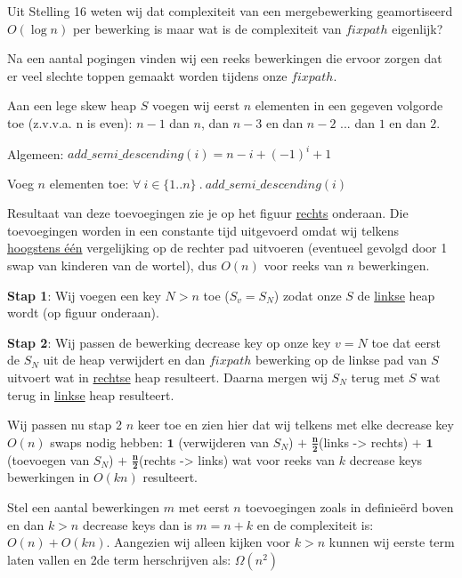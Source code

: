 \documentclass[12pt,a4paper,fleqn]{report}
\begin{document}
	Uit Stelling 16 weten wij dat complexiteit van een mergebewerking geamortiseerd
	$O(\log n)$ per bewerking is maar wat is de complexiteit van $fixpath$
	eigenlijk?
	\newline

	Na een aantal pogingen vinden wij een reeks bewerkingen die ervoor zorgen dat er veel slechte toppen gemaakt worden tijdens onze $fixpath$.

	Aan een lege skew heap $S$ voegen wij eerst $n$ elementen in een
	gegeven volgorde toe (z.v.v.a. n is even):
	$n-1$ dan $n$, dan $n-3$ en dan $n-2$ ... dan $1$ en dan $2$.
	\newline

	Algemeen: $add\_semi\_descending(i) = n - i + (-1)^i + 1$

	Voeg $n$ elementen toe: $\forall\ i\in \{1..n\}\ .\ add\_semi\_descending(i)$
	\newline

	Resultaat van deze toevoegingen zie je op het figuur \underline{rechts} onderaan.
	Die toevoegingen worden in een constante tijd uitgevoerd omdat wij telkens
	\underline{hoogstens één} vergelijking op de rechter pad uitvoeren
	(eventueel gevolgd door 1 swap van kinderen van de wortel),
	dus $O(n)$ voor reeks van $n$ bewerkingen.
	\newline

	\textbf{Stap 1}: Wij voegen een key $N > n$ toe ($S_v = S_N$) zodat onze $S$ de \underline{linkse} heap wordt (op figuur onderaan).

	\textbf{Stap 2}: Wij passen de bewerking decrease key op onze key $v = N$ toe dat
	eerst de $S_N$ uit de heap verwijdert en dan $fixpath$ bewerking op de linkse pad van $S$ uitvoert
	wat in \underline{rechtse} heap resulteert. Daarna mergen wij $S_N$ terug met $S$ wat terug in
	\underline{linkse} heap resulteert.

	Wij passen nu stap 2 $n$ keer toe en zien hier dat
	wij telkens met elke decrease key $O(n)$ swaps nodig hebben:
	\newline
	$\mathbf{1}$ (verwijderen van $S_N$) $+$ $\mathbf{\frac{n}{2}}$(links -> rechts) $+$
	\newline
	$\mathbf{1}$ (toevoegen van $S_N$) $+$ $\mathbf{\frac{n}{2}}$(rechts -> links)
	\newline
	wat voor reeks van $k$ decrease keys bewerkingen in $O(kn)$ resulteert.
	\newline

	Stel een aantal bewerkingen $m$ met eerst $n$ toevoegingen zoals in definieërd boven
	en dan $k > n$ decrease keys dan is $m = n + k$ en de complexiteit is: $O(n) + O(kn)$.
	Aangezien wij alleen kijken voor $k > n$ kunnen wij eerste term laten
	vallen en 2de term herschrijven als: $\Omega(n^2)$
\end{document}
